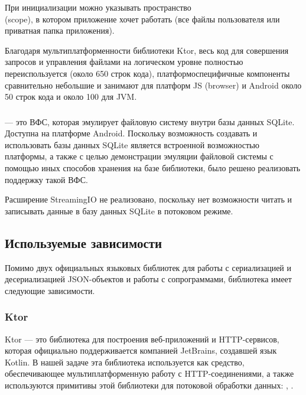     При инициализации  можно указывать пространство\\ (scope), в котором приложение хочет работать (все файлы пользователя или приватная папка приложения).

    Благодаря мультиплатформенности библиотеки Ktor, весь код для совершения запросов и управления файлами на логическом уровне полностью переиспользуется (около 650 строк кода), платформоспецифичные компоненты сравнительно небольшие и занимают для платформ JS (browser) и Android около 50 строк кода и около 100 для JVM.
  \subsubsection{}
     --- это ВФС, которая эмулирует файловую систему внутри базы данных SQLite. Доступна на платформе Android. Поскольку возможность создавать и использовать базы данных SQLite является встроенной возможностью платформы, а также с целью демонстрации эмуляции файловой системы с помощью иных способов хранения на базе библиотеки, было решено реализовать поддержку такой ВФС. 

    Расширение StreamingIO не реализовано, поскольку нет возможности читать и записывать данные в базу данных SQLite в потоковом режиме.


\subsection{Используемые зависимости}
  Помимо двух официальных языковых библиотек для работы с сериализацией и десериализацией JSON-объектов и работы с сопрограммами, библиотека  имеет следующие зависимости.
  \subsubsection{Ktor}\label{dependencies-ktor}
    Ktor\cite{ktor} --- это библиотека для построения веб-приложений и HTTP-сервисов, которая официально поддерживается компанией JetBrains, создавшей язык Kotlin. В нашей задаче эта библиотека используется как средство, обеспечивающее мультиплатформенную работу с HTTP-соединениями, а также используются примитивы этой библиотеки для потоковой обработки данных: , .

